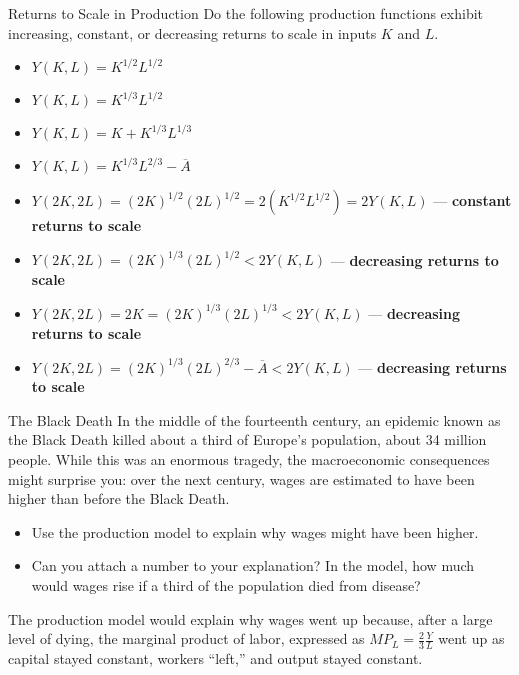 \documentclass[8pt]{extarticle}
\title{}
\author{Avinash Iyer}
\date{}
\begin{document}
\begin{mathbox}{Returns to Scale in Production}
    Do the following production functions exhibit increasing, constant, or decreasing returns to scale in inputs $K$ and $L$.
      \begin{itemize}
        \item $Y(K,L) = K^{1/2}L^{1/2}$
        \item $Y(K,L) = K^{1/3}L^{1/2}$
        \item $Y(K,L) = K + K^{1/3}L^{1/3}$
        \item $Y(K,L) = K^{1/3}L^{2/3} - \overline{A}$
      \end{itemize}
  \end{mathbox}
  \begin{itemize}
    \item $Y(2K, 2L) = (2K)^{1/2}(2L)^{1/2} = 2(K^{1/2}L^{1/2}) = 2Y(K,L)$ --- \textbf{constant returns to scale}
    \item $Y(2K, 2L) = (2K)^{1/3}(2L)^{1/2} < 2Y(K,L)$ --- \textbf{decreasing returns to scale}
    \item  $Y(2K, 2L) = 2K = (2K)^{1/3}(2L)^{1/3} < 2Y(K,L)$ --- \textbf{decreasing returns to scale}
    \item  $Y(2K,2L) = (2K)^{1/3}(2L)^{2/3} - \overline{A} < 2Y(K,L)$ --- \textbf{decreasing returns to scale}
  \end{itemize}
\begin{mathbox}{The Black Death}
      In the middle of the fourteenth century, an epidemic known as the Black Death killed about a third of Europe's population, about 34 million people. While this was an enormous tragedy, the macroeconomic consequences might surprise you: over the next century, wages are estimated to have been higher than before the Black Death.      
        \begin{itemize}
          \item Use the production model to explain why wages might have been higher.
          \item Can you attach a number to your explanation? In the model, how much would wages rise if a third of the population died from disease?
        \end{itemize}
    \end{mathbox}
    \noindent The production model would explain why wages went up because, after a large level of dying, the marginal product of labor, expressed as $MP_L = \frac{2}{3}\frac{Y}{L}$ went up as capital stayed constant, workers ``left,'' and output stayed constant.\\
    
\end{document}
